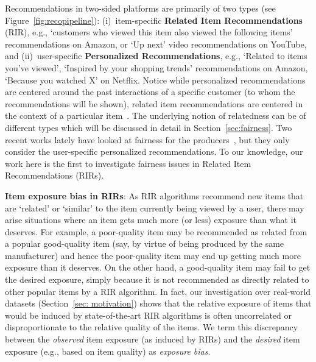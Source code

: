 Recommendations in two-sided platforms are primarily of two types (see Figure~\ref{fig:recopipeline}): 
	(i)~item-specific {\bf Related Item Recommendations} (RIR),  
	e.g., `customers who viewed this item also viewed the following items'
	recommendations on Amazon, or `Up next' video recommendations on YouTube, and 
	(ii)~user-specific {\bf Personalized Recommendations},  
	e.g., `Related to items you've viewed', `Inspired by your shopping trends' recommendations on Amazon, `Because you watched X' on Netflix. 
	Notice while personalized recommendations are centered around the past interactions of a specific customer (to whom the recommendations will be shown), related item recommendations are centered in the context of a particular item~\cite{yao2018judging}. The underlying notion of relatedness can be of different types which will be discussed in detail in Section~\ref{sec:fairness}.
	Two recent works lately have looked at fairness for the producers~\cite{patro2020fairrec,patro2020incremental}, but they only consider the user-specific personalized recommendations. %
	To our knowledge, our work here is the first to investigate fairness issues in Related Item Recommendations (RIRs).


\vspace{1 mm} 
\noindent\textbf{Item exposure bias in RIRs}: 
As RIR algorithms recommend new items that are `related' or `similar' to the item currently being viewed by a user, there may arise situations where an item gets much more (or less) exposure than what it deserves.
For example, a poor-quality item may be recommended as related from a popular good-quality item (say, by virtue of being produced by the same manufacturer) and hence
the poor-quality item may end up getting much more exposure than it deserves. 
On the other hand, a good-quality item may fail to get
the desired exposure, simply because it is not recommended as directly related
to other popular items by a RIR algorithm. 
In fact, our investigation over real-world datasets (Section~\ref{sec: motivation}) shows that the relative exposure of items that would be induced by state-of-the-art 
RIR algorithms is often uncorrelated or disproportionate to the relative quality of the items. 
We term this discrepancy between the {\it observed} item exposure (as induced by RIRs) and the {\it desired} item exposure (e.g., based on item quality) as {\it exposure bias}. 

